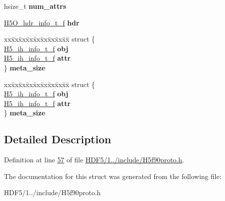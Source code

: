 \begin{DoxyCompactItemize}
hsize\+\_\+t {\bfseries num\+\_\+attrs}
\item 
\mbox{\label{struct_h5_o__info__t__f_aa90c11376d426eb65f281f9f45cd5d57}} 
\hyperlink{struct_h5_o__hdr__info__t__f}{H5\+O\+\_\+hdr\+\_\+info\+\_\+t\+\_\+f} {\bfseries hdr}
\item 
\mbox{\label{struct_h5_o__info__t__f_ab55a80dd7586699426b03b2e3d3fbc77}} 
\begin{tabbing}
xx\=xx\=xx\=xx\=xx\=xx\=xx\=xx\=xx\=\kill
struct \{\\
\>\hyperlink{struct_h5__ih__info__t__f}{H5\_ih\_info\_t\_f} {\bfseries obj}\\
\>\hyperlink{struct_h5__ih__info__t__f}{H5\_ih\_info\_t\_f} {\bfseries attr}\\
\} {\bfseries meta\_size}\\

\end{tabbing}\item 
\mbox{\label{struct_h5_o__info__t__f_aeb8b36954fdf88035a7214c38c110b7f}} 
\begin{tabbing}
xx\=xx\=xx\=xx\=xx\=xx\=xx\=xx\=xx\=\kill
struct \{\\
\>\hyperlink{struct_h5__ih__info__t__f}{H5\_ih\_info\_t\_f} {\bfseries obj}\\
\>\hyperlink{struct_h5__ih__info__t__f}{H5\_ih\_info\_t\_f} {\bfseries attr}\\
\} {\bfseries meta\_size}\\

\end{tabbing}\end{DoxyCompactItemize}


\subsection{Detailed Description}


Definition at line \hyperlink{_h_d_f5_21_810_81_2include_2_h5f90proto_8h_source_l00057}{57} of file \hyperlink{_h_d_f5_21_810_81_2include_2_h5f90proto_8h_source}{H\+D\+F5/1../include/\+H5f90proto.\+h}.



The documentation for this struct was generated from the following file\+:\begin{DoxyCompactItemize}
\item 
H\+D\+F5/1../include/\+H5f90proto.\+h\end{DoxyCompactItemize}
